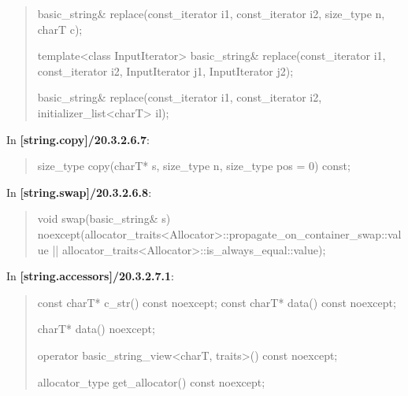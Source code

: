 \documentclass{wg21}
\begin{document}
\begin{quote}
\begin{itemdecl}
basic_string& replace(const_iterator i1, const_iterator i2, size_type n, charT c);
\end{itemdecl}

\begin{itemdecl}
template<class InputIterator>
  basic_string& replace(const_iterator i1, const_iterator i2, InputIterator j1, InputIterator j2);
\end{itemdecl}

\begin{itemdecl}
basic_string& replace(const_iterator i1, const_iterator i2, initializer_list<charT> il);
\end{itemdecl}
\end{quote}

In \textbf{[string.copy]/20.3.2.6.7}:
\begin{quote}
\begin{itemdecl}
size_type copy(charT* s, size_type n, size_type pos = 0) const;
\end{itemdecl}
\end{quote}

In \textbf{[string.swap]/20.3.2.6.8}:
\begin{quote}
\begin{itemdecl}
void swap(basic_string& s)
  noexcept(allocator_traits<Allocator>::propagate_on_container_swap::value ||
           allocator_traits<Allocator>::is_always_equal::value);
\end{itemdecl}
\end{quote}


In \textbf{[string.accessors]/20.3.2.7.1}:
\begin{quote}
\begin{itemdecl}
const charT* c_str() const noexcept;
const charT* data() const noexcept;
\end{itemdecl}

\begin{itemdecl}
charT* data() noexcept;
\end{itemdecl}

\begin{itemdecl}
operator basic_string_view<charT, traits>() const noexcept;
\end{itemdecl}

\begin{itemdecl}
allocator_type get_allocator() const noexcept;
\end{itemdecl}
\end{quote}
\end{document}
